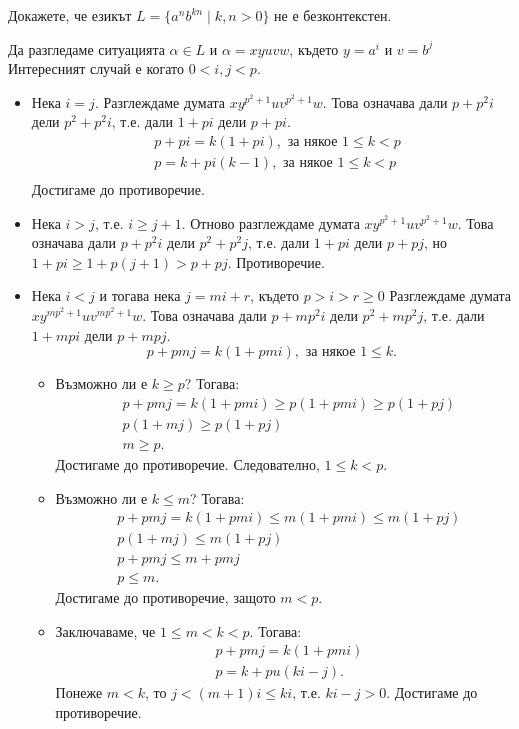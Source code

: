 \begin{problem}
  Докажете, че езикът $L = \{a^nb^{kn} \mid k,n > 0\}$ не е безконтекстен.
\end{problem}
\ifhints
\begin{hint}
  Да разгледаме ситуацията $\alpha \in L$ и
  $\alpha = xyuvw$, където $y = a^i$ и $v = b^j$
  Интересният случай е когато $0 < i,j < p$.
  \begin{itemize}
  \item 
    Нека $i = j$.
    Разглеждаме думата $xy^{p^2+1}uv^{p^2+1}w$.
    Това означава дали $p+p^2i$ дели $p^2+p^2i$, т.е.
    дали $1 + pi$ дели $p+pi$.
    \begin{align*}
      & p + pi = k(1+pi), \text{ за някое }1 \leq k < p\\
      & p = k + pi(k-1), \text{ за някое }1 \leq k < p\\
    \end{align*}
    Достигаме до противоречие.
  \item
    Нека $i > j$, т.е. $i \geq j+1$.
    Отново разглеждаме думата $xy^{p^2+1}uv^{p^2+1}w$.
    Това означава дали $p+p^2i$ дели $p^2+p^2j$, т.е.
    дали $1 + pi$ дели $p+pj$, но
    $1+pi \geq 1 + p(j+1) > p + pj$.
    Противоречие.
  \item
    Нека $i < j$ и тогава нека $j = mi + r$, където $p > i > r \geq 0$
    Разглеждаме думата $xy^{mp^2+1}uv^{mp^2+1}w$.
    Това означава дали $p+mp^2i$ дели $p^2+mp^2j$, т.е.
    дали $1 + mpi$ дели $p+mpj$.
    \[p+pmj = k(1+pmi), \text{ за някое }1 \leq k.\]
    \begin{itemize}
    \item 
      Възможно ли е $k \geq p$? Тогава:
      \begin{align*}
        & p + pmj = k(1+pmi) \geq p(1+pmi) \geq p(1+pj)\\
        & p(1+mj) \geq p(1+pj)\\
        & m \geq p.
      \end{align*}
      Достигаме до противоречие.
      Следователно, $1 \leq k < p$.
    \item
      Възможно ли е $k \leq m$? Тогава:
      \begin{align*}
        & p + pmj = k(1+pmi) \leq m(1+pmi) \leq m(1+pj)\\
        & p(1+mj) \leq m(1+pj)\\
        & p + pmj \leq m + pmj\\
        & p \leq m.
      \end{align*}
      Достигаме до противоречие, защото $m < p$.
    \item
      Заключаваме, че $1 \leq m < k < p$. Тогава:
      \begin{align*}
        & p + pmj = k(1+pmi)\\
        & p = k + pu(ki-j).
      \end{align*}
      Понеже $m < k$, то $j < (m+1)i \leq ki$,
      т.е. $ki-j > 0$. Достигаме до противоречие.
    \end{itemize}
  \end{itemize}
\end{hint}
\fi

